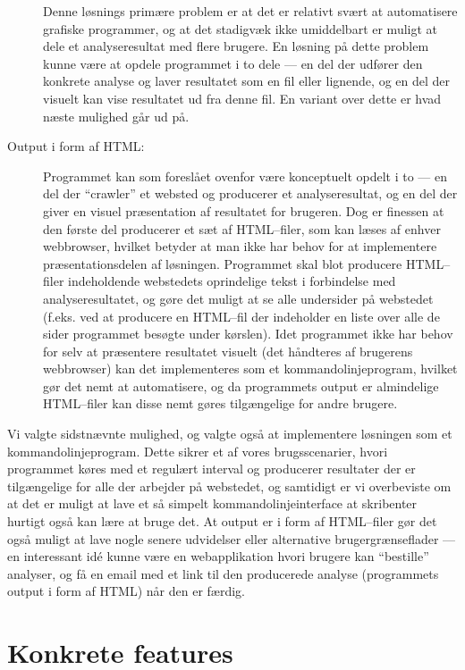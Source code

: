\documentclass[a4paper,oneside]{memoir}
\begin{document}
\begin{description}
  Denne løsnings primære problem er at det er relativt svært at
  automatisere grafiske programmer, og at det stadigvæk ikke
  umiddelbart er muligt at dele et analyseresultat med flere
  brugere. En løsning på dette problem kunne være at opdele programmet
  i to dele --- en del der udfører den konkrete analyse og laver
  resultatet som en fil eller lignende, og en del der visuelt kan vise
  resultatet ud fra denne fil. En variant over dette er hvad næste
  mulighed går ud på.

\item[Output i form af HTML:] Programmet kan som foreslået ovenfor
  være konceptuelt opdelt i to --- en del der ``crawler'' et websted
  og producerer et analyseresultat, og en del der giver en visuel
  præsentation af resultatet for brugeren. Dog er finessen at den
  første del producerer et sæt af HTML--filer, som kan læses af enhver
  webbrowser, hvilket betyder at man ikke har behov for at
  implementere præsentationsdelen af løsningen. Programmet skal blot
  producere HTML--filer indeholdende webstedets oprindelige tekst i
  forbindelse med analyseresultatet, og gøre det muligt at se alle
  undersider på webstedet (f.eks. ved at producere en HTML--fil der
  indeholder en liste over alle de sider programmet besøgte under
  kørslen). Idet programmet ikke har behov for selv at præsentere
  resultatet visuelt (det håndteres af brugerens webbrowser) kan det
  implementeres som et kommandolinjeprogram, hvilket gør det nemt at
  automatisere, og da programmets output er almindelige HTML--filer
  kan disse nemt gøres tilgængelige for andre brugere.
\end{description}

Vi valgte sidstnævnte mulighed, og valgte også at implementere
løsningen som et kommandolinjeprogram. Dette sikrer et af vores
brugsscenarier, hvori programmet køres med et regulært interval og
producerer resultater der er tilgængelige for alle der arbejder på
webstedet, og samtidigt er vi overbeviste om at det er muligt at lave
et så simpelt kommandolinjeinterface at skribenter hurtigt også kan
lære at bruge det. At output er i form af HTML--filer gør det også
muligt at lave nogle senere udvidelser eller alternative
brugergrænseflader --- en interessant idé kunne være en web\-applikation
hvori brugere kan ``bestille'' analyser, og få en email med et link
til den producerede analyse (programmets output i form af HTML) når
den er færdig.

\section{Konkrete features}
\end{document}
